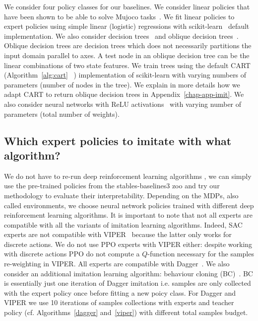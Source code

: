 We consider four policy classes for our baselines.
We consider linear policies that have been shown to be able to solve Mujoco tasks~\cite{empirical-evidence}.
We fit linear policies to expert policies using simple linear (logistic) regressions with scikit-learn~\cite{scikit-learn} default implementation.
We also consider decision trees~\cite{breiman1984clasification} and oblique decision trees~\cite{murthy1994system}.
Oblique decision trees are decision trees which does not necessarily partitions the input domain parallel to axes.
A test node in an oblique decision tree can be the linear combinations of two state features. 
We train trees using the default CART (Algorithm~\ref{alg:cart} ~\cite{breiman1984clasification}) implementation of scikit-learn with varying numbers of parameters (number of nodes in the tree).
We explain in more details how we adapt CART to return oblique decision trees in Appendix~\ref{chap-app-imit}.
We also consider neural networks with ReLU activations~\cite{relunet} with varying number of parameters (total number of weights).

\subsection{Which expert policies to imitate with what algorithm?}
We do not have to re-run deep reinforcement learning algorithms \cite{dqn,ppo,deep-rl-relu1}, we can simply use the pre-trained policies from the stables-baselines3 zoo \cite{zoo} and try our methodology to evaluate their interpretability.
Depending on the MDPs, also called environments, we choose neural network policies trained with different deep reinforcement learning algorithms.
It is important to note that not all experts are compatible with all the variants of imitation learning algorithms.
Indeed, SAC experts \cite{deep-rl-relu1} are not compatible with VIPER~\cite{viper} because the latter only works for discrete actions.
We do not use PPO experts with VIPER either: despite working with discrete actions PPO do not compute a $Q$-function necessary for the samples re-weighting in VIPER.
All experts are compatible with Dagger~\cite{dagger}.
We also consider an additional imitation learning algorithm: behaviour cloning (BC)~\cite{behaviour-cloning}.
BC is essentially just one iteration of Dagger imitation i.e. samples are only collected with the expert policy once before fitting a new poicy class.
For Dagger and VIPER we use 10 iterations of samples collections with experts and teacher policy (cf. Algorithms~\ref{dagger} and~\ref{viper}) with different total samples budget.

